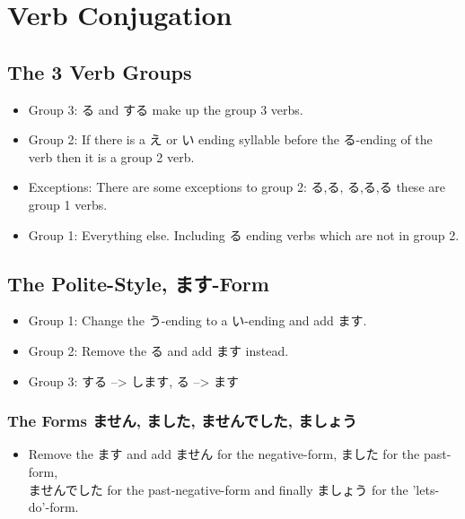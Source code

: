 \documentclass{article}
\newcommand\tabyon[1][0.4cm]{\hspace*{#1}}
\begin{document}

\tableofcontents
\newpage

\section{Verb Conjugation}
\subsection{The 3 Verb Groups}
\begin{itemize}
\item Group 3: る and する make up the group 3 verbs.
\item Group 2: If there is a え or い ending syllable before the
 る-ending of the verb then it is a group 2 verb.
\item Exceptions: There are some exceptions to group 2: る,る,
る,る,る these are group 1 verbs.
\item Group 1: Everything else. Including る ending verbs which are not in group 2.
\end{itemize}
\subsection{The Polite-Style, ます-Form}
\begin{itemize}
\item Group 1: Change the う-ending to a い-ending and add ます.
\item Group 2: Remove the る and add ます instead.
\item Group 3: する --> します, \tabyon {}る --> ます
\end{itemize}
\subsubsection{The Forms ません, ました, ませんでした, ましょう}
\begin{itemize} \item Remove the ます and add ません for the negative-form, ました for the past-form,\\
ませんでした for the past-negative-form and finally ましょう for the 'lets-do'-form.
\end{itemize}
\end{document}
